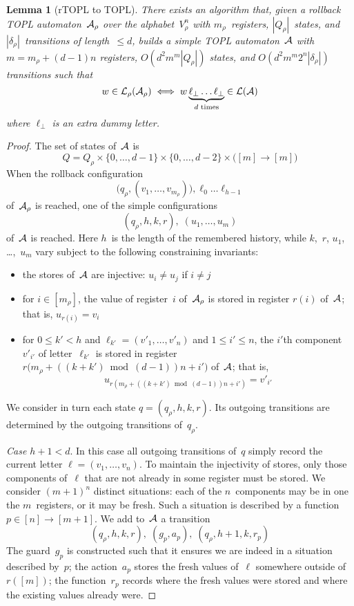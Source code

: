 \documentclass[9pt, preprint]{sigplanconf} %
\newtheorem{lemma}{Lemma}
\theoremstyle{definition}
\theoremstyle{remark}
\begin{document}
\begin{lemma}[rTOPL to TOPL]\label{lemma:rtopl-to-topl}
There exists an algorithm that, given a rollback TOPL automaton~${\cal A}_\rho$ over the alphabet~$V_\rho^n$ with $m_\rho$~registers, $|Q_\rho|$~states, and $|\delta_\rho|$~transitions of length~$\le d$, builds a simple TOPL automaton~${\cal A}$ with $m=m_\rho+(d-1)n$ registers, $O(d^2m^m|Q_\rho|)$ states, and $O(d^2 m^m 2^n|\delta_\rho|)$ transitions such that
\[ w\in{\cal L}_\rho({\cal A}_\rho) \iff w\underbrace{\ell_\bot\ldots\ell_\bot}_{\text{$d$~times}}\in{\cal L}({\cal A})\]
where $\ell_\bot$ is an extra dummy letter.
\end{lemma}
\begin{proof}
The set of states of~${\cal A}$ is \[Q=Q_\rho\times\{0,\ldots,d-1\}\times\{0,\ldots,d-2\}\times\bigl([m]\to[m]\bigr)\]
When the rollback configuration
\[ \bigl(q_\rho,(v_1,\ldots,v_{m_\rho})\bigr),\ell_0\ldots\ell_{h-1}\]
of~${\cal A}_\rho$ is reached, one of the simple configurations
\[ (q_\rho,h,k,r),\;(u_1,\ldots,u_m) \]
of~${\cal A}$ is reached.
Here $h$~is the length of the remembered history, while $k$,~$r$, $u_1$, \dots,~$u_m$ vary subject to the following constraining invariants:
\begin{itemize}
\item the stores of~${\cal A}$ are injective: $u_i \ne u_j$ if $i\ne j$
\item for $i\in[m_\rho]$, the value of register~$i$ of~${\cal A}_\rho$ is stored in register $r(i)$ of~${\cal A}$; that is, $ u_{r(i)} = v_i $
\item for $0\le k'<h$ and $\ell_{k'}=(v'_1,\ldots,v'_n)$ and $1\le i'\le n$, the $i'$th component~$v'_{i'}$ of letter~$\ell_{k'}$ is stored in register $r\bigl(m_\rho+((k+k')\bmod(d-1))n+i'\bigr)$ of~${\cal A}$; that is,
  \[u_{r(m_\rho+((k+k')\bmod(d-1))n+i')}=v'_{i'}\]
\end{itemize}

\smallskip
We consider in turn each state $q=(q_\rho,h,k,r)$.
Its outgoing transitions are determined by the outgoing transitions of~$q_\rho$.

{\it Case $h+1<d$}.
In this case all outgoing transitions of~$q$ simply record the current letter $\ell=(v_1,\ldots,v_n)$.
To maintain the injectivity of stores, only those components of~$\ell$ that are not already in some register must be stored.
We consider $(m+1)^n$ distinct situations: each of the $n$~components may be in one the $m$~registers, or it may be fresh.
Such a situation is described by a function $p\in[n]\to[m+1]$.
We add to~${\cal A}$ a transition
\[ (q_\rho,h,k,r),\;(g_p,a_p),\;(q_\rho,h+1,k,r_p)\]
The guard~$g_p$ is constructed such that it ensures we are indeed in a situation described by~$p$; the action~$a_p$ stores the fresh values of~$\ell$ somewhere outside of $r([m])$; the function~$r_p$ records where the fresh values were stored and where the existing values already were.


\end{proof}
\end{document}
